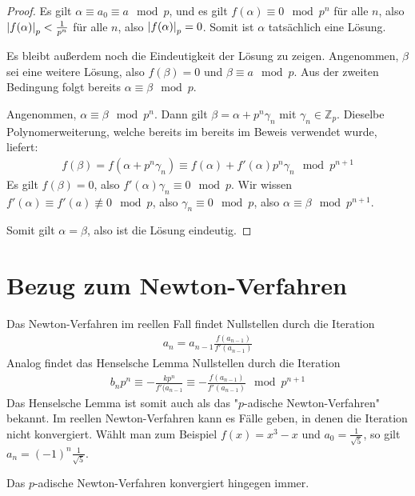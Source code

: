 \documentclass{report}
\newcommand*{\newpar}{\par\vspace{\baselineskip}\noindent}
\newcommand{\bZ}{\mathbb{Z}}
\begin{document}
\begin{proof}
	\newpar
	Es gilt $\alpha \equiv a_0 \equiv a \mod p$, und es gilt $f(\alpha) \equiv 0 \mod p^n$ für alle $n$, also $\abs{f(\alpha)}_p < \frac{1}{p^n}$ für alle $n$, also $\abs{f(\alpha)}_p = 0$. Somit ist $\alpha$ tatsächlich eine Lösung.
	\newpar
	Es bleibt außerdem noch die Eindeutigkeit der Lösung zu zeigen. Angenommen, $\beta$ sei eine weitere Lösung, also $f(\beta) = 0$ und $\beta \equiv a \mod p$. Aus der zweiten Bedingung folgt bereits $\alpha \equiv \beta \mod p$.
	\newpar
	Angenommen, $\alpha \equiv \beta \mod p^n$. Dann gilt $\beta = \alpha + p^n \gamma_n$ mit $\gamma_n \in \bZ_p$. Dieselbe Polynomerweiterung, welche bereits im bereits im Beweis verwendet wurde, liefert:
	\begin{align*}
		f(\beta) = f(\alpha + p^n \gamma_n) \equiv f(\alpha) + f'(\alpha)p^n\gamma_n \mod p^{n + 1}
	\end{align*}
	Es gilt $f(\beta) = 0$, also $f'(\alpha)\gamma_n \equiv 0 \mod p$. Wir wissen $f'(\alpha) \equiv f'(a) \not \equiv 0 \mod p$, also $\gamma_n \equiv 0 \mod p$, also $\alpha \equiv \beta \mod p^{n + 1}$.
	\newpar
	Somit gilt $\alpha = \beta$, also ist die Lösung eindeutig.
	\end{proof}
	\clearpage
	\section{Bezug zum Newton-Verfahren}
	Das Newton-Verfahren im reellen Fall findet Nullstellen durch die Iteration
	\begin{align*}
		a_n = a_{n-1} \frac{f(a_{n-1})}{f'(a_{n-1})}
	\end{align*}
	Analog findet das Henselsche Lemma Nullstellen durch die Iteration
	\begin{align*}
		b_np^n \equiv -\frac{kp^n}{f'(a_{n-1}} \equiv -\frac{f(a_{n-1})}{f'(a_{n-1})} \mod p^{n+1}
	\end{align*}
	Das Henselsche Lemma ist somit auch als das "$p$-adische Newton-Verfahren" bekannt. Im reellen Newton-Verfahren kann es Fälle geben, in denen die Iteration nicht konvergiert. Wählt man zum Beispiel $f(x) = x^3 - x$ und $a_0 = \frac{1}{\sqrt{5}}$, so gilt
	$a_n = (-1)^n \frac{1}{\sqrt{5}}$.
	\newpar
	Das $p$-adische Newton-Verfahren konvergiert hingegen immer.
\end{document}
